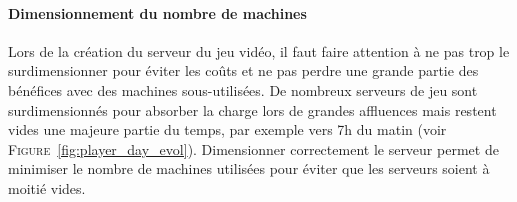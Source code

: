 \paragraph{Dimensionnement du nombre de machines\\}
Lors de la création du serveur du jeu vidéo, il faut faire attention à ne pas trop le surdimensionner pour éviter les coûts et ne pas perdre une grande partie des bénéfices avec des machines sous-utilisées.
De nombreux serveurs de jeu sont surdimensionnés pour absorber la charge lors de grandes affluences mais restent vides une majeure partie du temps, par exemple vers 7h du matin (voir \textsc{Figure}~\ref{fig:player_day_evol}).
Dimensionner correctement le serveur permet de minimiser le nombre de machines utilisées pour éviter que les serveurs soient à moitié vides.


